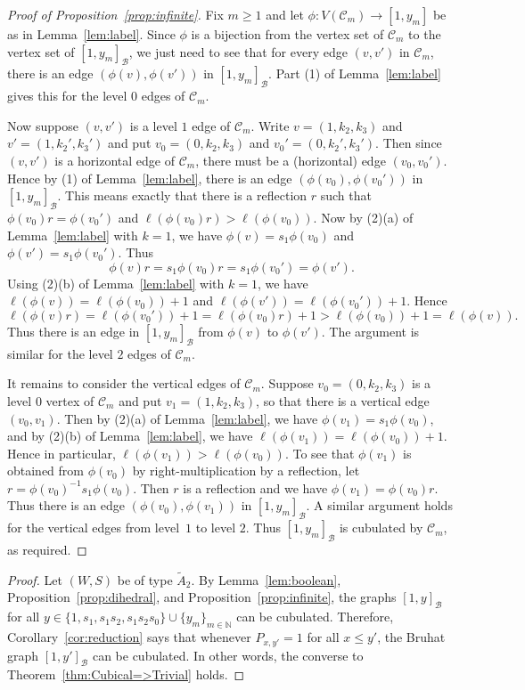 \documentclass[11pt]{amsart}
\theoremstyle{plain}
\theoremstyle{definition}
\newcommand{\cC}{\mathcal{C}}
\newcommand{\N}{\mathbb{N}}
\newcommand{\cB}{\mathcal B}
\numberwithin{equation}{subsection}
\begin{document}
\begin{proof}[Proof of Proposition~\ref{prop:infinite}]
Fix $m \geq 1$ and let $\phi:V(\cC_m) \to [1,y_m]$ be as in Lemma~\ref{lem:label}. Since $\phi$ is a bijection from the vertex set of $\cC_m$ to the vertex set of $[1,y_m]_\cB$, we just need to see that for every edge $(v,v')$ in $\cC_m$, there is an edge $(\phi(v),\phi(v'))$ in $[1,y_m]_\cB$. Part (1) of Lemma~\ref{lem:label} gives this for the level $0$ edges of $\cC_m$. 

Now suppose $(v,v')$ is a level $1$ edge of $\cC_m$. Write $v = (1,k_2,k_3)$ and $v' = (1,k_2',k_3')$ and put $v_0 = (0,k_2,k_3)$ and $v_0' = (0,k_2',k_3')$. Then since $(v,v')$ is a horizontal edge of $\cC_m$, there must be a (horizontal) edge $(v_0, v_0')$. Hence by (1) of Lemma~\ref{lem:label}, there is an edge $(\phi(v_0),\phi(v_0'))$ in $[1,y_m]_\cB$.  This means exactly that there is a reflection $r$ such that $\phi(v_0) r = \phi(v_0')$ and $\ell(\phi(v_0)r) > \ell(\phi(v_0))$. Now by (2)(a) of Lemma~\ref{lem:label} with $k = 1$, we have $\phi(v) = s_1 \phi(v_0)$ and $\phi(v') = s_1 \phi(v_0')$. Thus \[\phi(v) r = s_1 \phi(v_0) r = s_1 \phi(v_0') = \phi(v').\] Using (2)(b) of Lemma~\ref{lem:label} with $k = 1$, we have $\ell(\phi(v)) = \ell(\phi(v_0)) + 1$ and $\ell(\phi(v')) = \ell(\phi(v_0')) + 1$. Hence
\[
\ell(\phi(v) r) =  \ell(\phi(v_0')) + 1 = \ell(\phi(v_0)r) +1 > \ell(\phi(v_0)) + 1 = \ell(\phi(v)).
\]
Thus there is an edge in $[1,y_m]_\cB$ from $\phi(v)$ to $\phi(v')$. The argument is similar for the level $2$ edges of $\cC_m$.

It remains to consider the vertical edges of $\cC_m$. Suppose $v_0 = (0,k_2,k_3)$ is a level $0$ vertex of $\cC_m$ and put $v_1 = (1,k_2,k_3)$, so that there is a vertical edge $(v_0,v_1)$. Then by (2)(a) of Lemma~\ref{lem:label}, we have $\phi(v_1) = s_1 \phi(v_0)$, and by (2)(b) of Lemma~\ref{lem:label}, we have $\ell(\phi(v_1)) = \ell(\phi(v_0)) + 1$. Hence in particular, $\ell(\phi(v_1)) > \ell(\phi(v_0))$. To see that $\phi(v_1)$ is obtained from $\phi(v_0)$ by right-multiplication by a reflection, let $r = \phi(v_0)^{-1} s_1 \phi(v_0)$. Then $r$ is a reflection and we have $\phi(v_1) = \phi(v_0) r$. Thus there is an edge $(\phi(v_0) , \phi(v_1))$ in $[1,y_m]_\cB$. A similar argument holds for the vertical edges from level~$1$ to level $2$. Thus $[1,y_m]_\cB$ is cubulated by $\cC_m$, as required.
\end{proof}

\MainTheoremD

\begin{proof}%
Let $(W,S)$ be of type $\tilde{A}_2$. By Lemma~\ref{lem:boolean}, Proposition~\ref{prop:dihedral}, and Proposition~\ref{prop:infinite}, the graphs $[1,y]_\cB$ for all $y \in \{ 1, s_1, s_1 s_2, s_1 s_2 s_0 \} \cup \{ y_m \}_{m \in \N}$ can be cubulated. Therefore, Corollary~\ref{cor:reduction} says that whenever $P_{x,y'} = 1$ for all $x \leq y'$, the Bruhat graph $[1,y']_\cB$ can be cubulated.  In other words, the converse to Theorem~\ref{thm:Cubical=>Trivial} holds. 
\end{proof}
\end{document}
